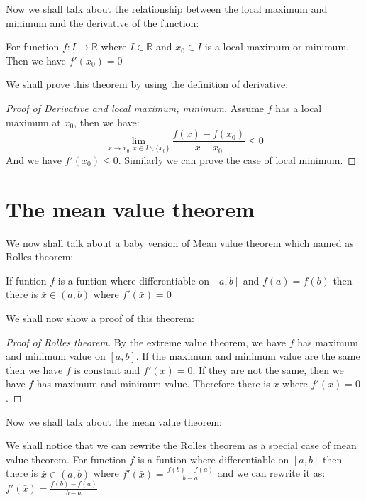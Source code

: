 \documentclass{article}
\newcommand{\R}{\mathbb{R}}
\begin{document}
Now we shall talk about the relationship between the local maximum and minimum and the derivative of the function:
\begin{theorem}
  For function $f:I\to \R$ where $I\in \R$ and $x_0\in I$ is a local maximum or minimum. Then we have $f'(x_0)=0$
\end{theorem}
We shall prove this theorem by using the definition of derivative:
\begin{proof}[Proof of Derivative and local maximum, minimum]
  Assume $f$ has a local maximum at $x_0$, then we have:
  \begin{equation*}
    \lim_{x\to x_0,x\in I\backslash \{x_0\}} \frac{f(x)-f(x_0)}{x-x_0}\leq 0
  \end{equation*}
  And we have $f'(x_0)\leq 0$. Similarly we can prove the case of local minimum.
\end{proof}



\section{The mean value theorem}
We now shall talk about a baby version of Mean value theorem which named as Rolles theorem:
\begin{theorem}
   If funtion $f$ is a funtion where differentiable on $[a,b]$ and $f(a)=f(b)$ then there is $\bar{x}\in (a,b)$ where $f'(\bar{x})=0$
\end{theorem}
We shall now show a proof of this theorem:
\begin{proof}[Proof of Rolles theorem]
  By the extreme value theorem, we have $f$ has maximum and minimum value on $[a,b]$. If the maximum and minimum value are the same then we have $f$ is constant and $f'(\bar{x})=0$. If they are not the same,
  then we have $f$ has maximum and minimum value. Therefore there is $\bar{x}$ where $f'(\bar{x})=0$.
\end{proof}
Now we shall talk about the mean value theorem:
  \begin{theorem}
We shall notice that we can rewrite the Rolles theorem as a special case of mean value theorem.
For function $f$ is a funtion where differentiable on $[a,b]$ then there is $\bar{x}\in (a,b)$
where $f'(\bar{x})=\frac{f(b)-f(a)}{b-a}$ and we can rewrite it as: $f'(\bar{x})=\frac{f(b)-f(a)}{b-a}$
\end{theorem}
\end{document}
